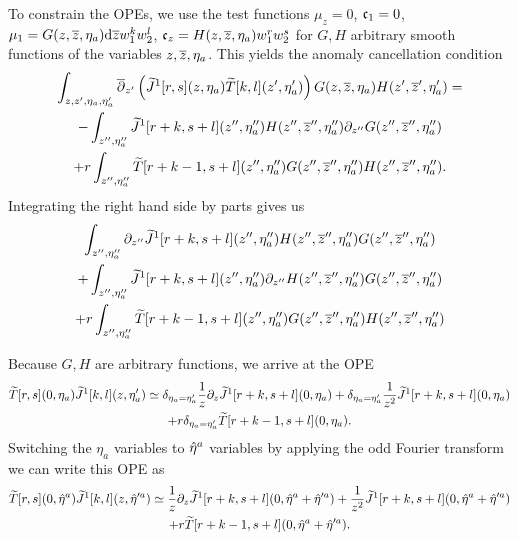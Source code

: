 \documentclass[../main.tex]{subfiles}
\begin{document}
To constrain the OPEs, we use the test functions $\mu_z = 0$, $\mathfrak{c}_1 = 0$, $\mu_1 = G(z,{\overline{z}},\eta_a) \mathrm{d} {\overline{z}} w_1^k w_2^l$, 
$\mathfrak{c}_z = H(z,{\overline{z}},\eta_a) w_1^r w_2^s$
for $G,H$ arbitrary smooth functions of the variables $z,{\overline{z}},\eta_a$.
This yields the anomaly cancellation condition
\begin{multline}
\int_{z,z',\eta_a,\eta_a'} \overline{\partial}_{z'}\left(\widetilde{J}^1 [r,s] (z,\eta_a) \widetilde{T}[k,l](z',\eta_a')\right) G(z,{\overline{z}},\eta_a) H(z',{\overline{z}}', \eta_a') = \\
- \int_{z'', \eta_a''} \widetilde{J}^1[r+k, s+l] (z'', \eta_a'') H(z'', {\overline{z}}'', \eta_a'') \partial_{z''} G(z'', {\overline{z}}'', \eta_a'') \\ 
+ r \int_{z'',\eta_a''} \widetilde{T}[r+k-1, s+l] (z'',\eta_a'') G(z'',{\overline{z}}'', \eta_a'') H(z'',{\overline{z}}'', \eta_a'') .
\end{multline}
Integrating the right hand side by parts gives us
\begin{multline}
\int_{z'', \eta_a''} \partial_{z''} \widetilde{J}^1[r+k, s+l] (z'', \eta_a'') H(z'', {\overline{z}}'', \eta_a'') G(z'', {\overline{z}}'', \eta_a'') \\ +  \int_{z'', \eta_a''} \widetilde{J}^1[r+k, s+l] (z'', \eta_a'') \partial_{z''} H(z'', {\overline{z}}'', \eta_a'')  G(z'', {\overline{z}}'', \eta_a'') \\
+ r \int_{z'',\eta_a''} \widetilde{T}[r+k-1, s+l] (z'',\eta_a'') G(z'',{\overline{z}}'', \eta_a'') H(z'',{\overline{z}}'', \eta_a'') 
\end{multline}

Because $G,H$ are arbitrary functions, we arrive at the OPE
\begin{multline}
\widetilde{T}[r,s](0,\eta_a) \widetilde{J}^1[k,l] (z,\eta_a') \simeq \delta_{\eta_a=\eta_a'} \frac1z \partial_z \widetilde{J}^1[r+k,s+l](0,\eta_a) + \delta_{\eta_a=\eta_a'} \frac{1}{z^2} \widetilde{J}^1[r+k,s+l](0,\eta_a) \\ + r \delta_{\eta_a=\eta_a'} \widetilde{T}[r+k-1,s+l] (0,\eta_a).
\end{multline}
Switching the $\eta_a$ variables to $\Hat{\eta}^a$ variables by applying the odd Fourier transform we can write this OPE as
\begin{multline}
\widetilde{T}[r,s](0,\Hat{\eta}^a) \widetilde{J}^1[k,l] (z,\Hat{\eta}'^a) \simeq \frac1z \partial_z \widetilde{J}^1[r+k,s+l](0,\Hat{\eta}^a + \Hat{\eta}'^a) + \frac{1}{z^2} \widetilde{J}^1[r+k,s+l](0,\Hat{\eta}^a + \Hat{\eta}'^a)  \\ + r \widetilde{T}[r+k-1,s+l] (0,\Hat{\eta}^a + \Hat{\eta}'^a) .
\end{multline}

\subsubsection{}
\end{document}
